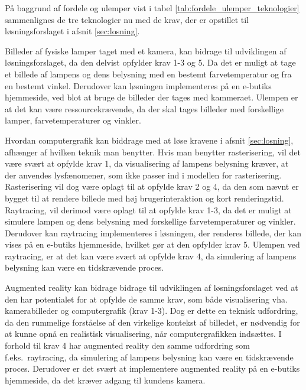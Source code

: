 På baggrund af fordele og ulemper vist i tabel \ref{tab:fordele_ulemper_teknologier} sammenlignes de tre teknologier nu med de krav, der er opstillet til løsningsforslaget i afsnit \ref{sec:losning}. 

Billeder af fysiske lamper taget med et kamera, kan bidrage til udviklingen af løsningsforslaget, da den delvist opfylder krav 1-3 og 5. Da det er muligt at tage et billede af lampens og dens belysning med en bestemt farvetemperatur og fra en bestemt vinkel. Derudover kan løsningen implementeres på en e-butiks hjemmeside, ved blot at bruge de billeder der tages med kammeraet. Ulempen er at det kan være ressourcekrævende, da der skal tages billeder med forskellige lamper, farvetemperaturer og vinkler.

Hvordan computergrafik kan biddrage med at løse kravene i afsnit \ref{sec:losning}, afhænger af hvilken teknik man benytter. Hvis man benytter rasterisering, vil det være svært at opfylde krav 1, da visualisering af lampens belysning kræver, at der anvendes lysfænomener, som ikke passer ind i modellen for rasterisering. Rasterisering vil dog være oplagt til at opfylde krav 2 og 4, da den som nævnt er bygget til at rendere billede med høj brugerinteraktion og kort renderingstid.
Raytracing, vil derimod være oplagt til at opfylde krav 1-3, da det er muligt at simulere lampen og dens belysning med forskellige farvetemperaturer og vinkler. Derudover kan raytracing implementeres i løsningen, der renderes billede, der kan vises på en e-butiks hjemmeside, hvilket gør at den opfylder krav 5. Ulempen ved raytracing, er at det kan være svært at opfylde krav 4, da simulering af lampens belysning kan være en tidskrævende proces.

Augmented reality kan bidrage bidrage til udviklingen af løsningsforslaget ved at den har potentialet for at opfylde de samme krav, som både visualisering vha. kamerabilleder og computergrafik (krav 1-3). Dog er dette en teknisk udfordring, da den rummelige forståelse af den virkelige kontekst af billedet, er nødvendig for at kunne opnå en realistisk visualisering, når computergrafikken indsættes. I forhold til krav 4 har augmented reality den samme udfordring som f.eks.\ raytracing, da simulering af lampens belysning kan være en tidskrævende proces. Derudover er det svært at implementere augmented reality på en e-butiks hjemmeside, da det kræver adgang til kundens kamera. 



\clearpage

